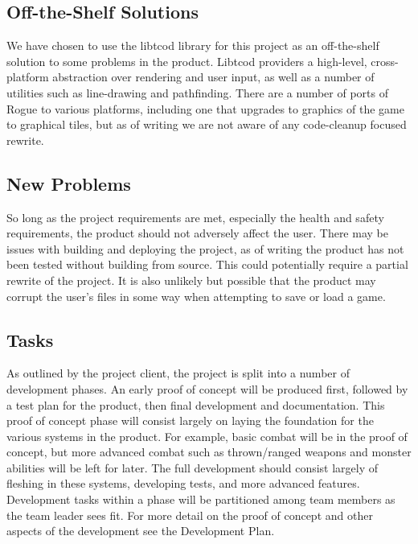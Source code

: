 \documentclass[12pt, titlepage]{article}
\begin{document}
	\subsection{Off-the-Shelf Solutions}

		We have chosen to use the libtcod library for this project as an off-the-shelf solution to some problems in the product. Libtcod providers a high-level, cross-platform abstraction over rendering and user input, as well as a number of utilities such as line-drawing and pathfinding. There are a number of ports of Rogue to various platforms, including one that upgrades to graphics of the game to graphical tiles, but as of writing we are not aware of any code-cleanup focused rewrite.

	\subsection{New Problems}

		So long as the project requirements are met, especially the health and safety requirements, the product should not adversely affect the user. There may be issues with building and deploying the project, as of writing the product has not been tested without building from source. This could potentially require a partial rewrite of the project. It is also unlikely but possible that the product may corrupt the user's files in some way when attempting to save or load a game.

	\subsection{Tasks}

		As outlined by the project client, the project is split into a number of development phases. An early proof of concept will be produced first, followed by a test plan for the product, then final development and documentation. This proof of concept phase will consist largely on laying the foundation for the various systems in the product. For example, basic combat will be in the proof of concept, but more advanced combat such as thrown/ranged weapons and monster abilities will be left for later. The full development should consist largely of fleshing in these systems, developing tests, and more advanced features. Development tasks within a phase will be partitioned among team members as the team leader sees fit. For more detail on the proof of concept and other aspects of the development see the Development Plan.
\end{document}
